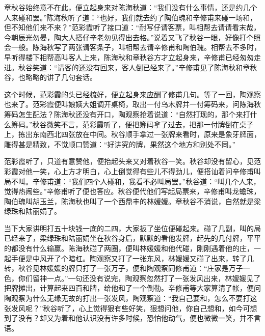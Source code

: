 \documentclass[12pt,UTF8]{ctexbook}
\begin{document}
{{{章秋谷始终意不在此，便立起身来对陈海秋道：“我们没有什么事情，还是约几个人来碰和罢。”陈海秋听了道：“也好，我们就去约了陶伯瑰和辛修甫来碰一场和，但不知他们来不来？”范彩霞听了接口道：“耐写仔请客票，叫相帮去请请看末哉，今朝辰光勿晏，陶大人搭仔辛老勿见得出去格。”说着又飞了秋谷一眼，好像打个照会一般。陈海秋写了两张请客条子，叫相帮去请辛修甫和陶伯瑰。相帮去不多时，早听得楼下相帮高叫客人上来，陈海秋和章秋谷方才立起身来，辛修甫已经匆匆走进。秋谷笑道：“请客的还没有回来，客人倒已经来了。”辛修甫见了陈海秋和章秋谷，也略略的讲了几句套话。

这个时候，范彩霞的头已经梳好，便立起身来应酬了修甫几句。等了一回，陶观察也来了。范彩霞便叫娘姨大姐调开桌椅，取出一付乌木牌并一付筹码来，问陈海秋筹码怎生配法？陈海秋还没有开口，陶观察抢着说道：“自然打现的，那个来打什么筹码。”秋谷微笑不言，范彩霞听了，便把筹码拿了过去，把那一付牌倒在桌子上，拣出东南西北四张放在中间。秋谷顺手拿过一张牌来看时，原来是象牙牌面，雕得甚是精致，不觉顺口赞道：“好讲究的牌，果然这个地方和别处不同。”

范彩霞听了，只道有意赞他，便抬起头来又对着秋谷一笑。秋谷却没有留心，见范彩霞对他一笑，心上方才明白，心上倒觉得有些儿不得劲儿，便搭讪着问辛修甫叫局不叫。辛修甫道：“我们四个人碰和，我看不必叫局罢。”秋谷道：“叫几个人来，觉得热闹些。”辛修甫听了便也答应。秋谷便代他们写起局票来，辛修甫叫龙蟾珠，陶伯瑰叫胡玉兰，陈海秋也叫了一个西鼎丰的林媛媛。章秋谷不消说，自然就是梁绿珠和陆丽娟了。

当下大家讲明打五十块钱一底的二四，大家扳了坐位便碰起来。碰了几副，叫的局已经来了，梁绿珠和陆丽娟坐在秋谷身后，默默的看他发牌，起先的几付牌，平平的都没有什么输赢。陈海秋碰了两圈，便叫林媛媛和他代碰，刚刚遇着他的庄，一起手便是中风开了个暗杠。陶观察又打了一张东风，林媛媛又碰了出来，转了几转，秋谷见林媛媛的牌只打了一张万子，便和陶观察同修甫道：“庄家是万子一色，你们留神一点。”一句还没有说完，陶观察忽然打了一张发风出来，林嫒媛见了把牌摊出，计算起来四百和牌，给他和了一个倒勒。辛修甫等大家算清了帐，便问陶观察为什么无缘无故的打出一张发风，陶观察道：“我自己要和，怎么不要打这张发风呢？”秋谷听了，心上觉得狠有些好笑，狠想问他，你自己想和，如今可想到了没有？却又为着和他认识没有许多时候，恐怕他动气，便也微微一笑，并不言语。

}}}
\end{document}
